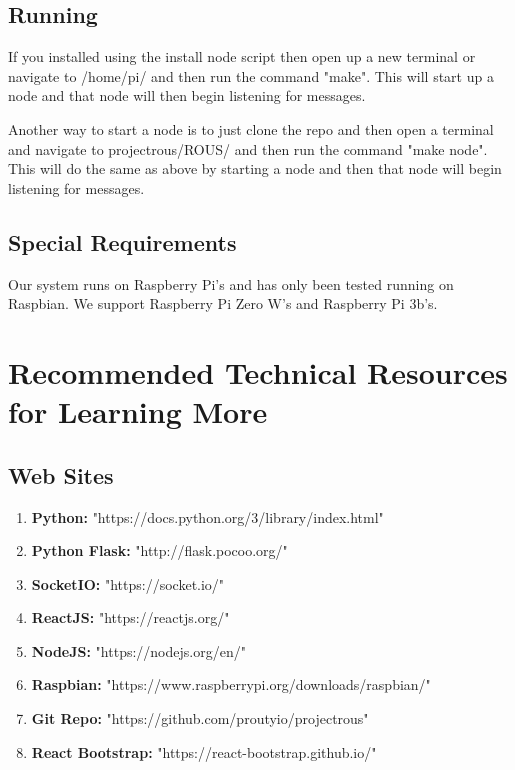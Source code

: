 \documentclass[draftclsnofoot, onecolumn, compsoc, 10pt]{IEEEtran}
\begin{document}
\subsection{Running}
If you installed using the install node script then open up a new terminal or navigate to /home/pi/ and then run the command "make". This will start up a node and that node will then begin listening for messages.

Another way to start a node is to just clone the repo and then open a terminal and navigate to projectrous/ROUS/ and then run the command "make node". This will do the same as above by starting a node and then that node will begin listening for messages.

\subsection{Special Requirements}
Our system runs on Raspberry Pi's and has only been tested running on Raspbian. We support Raspberry Pi Zero W's and Raspberry Pi 3b's. 

\section{Recommended Technical Resources for Learning More}
\subsection{Web Sites}
\begin{enumerate}
    \item \textbf{Python:} "https://docs.python.org/3/library/index.html"
    \item \textbf{Python Flask:} "http://flask.pocoo.org/"
    \item \textbf{SocketIO:} "https://socket.io/"
    \item \textbf{ReactJS:} "https://reactjs.org/"
    \item \textbf{NodeJS:} "https://nodejs.org/en/"
    \item \textbf{Raspbian:} "https://www.raspberrypi.org/downloads/raspbian/"
    \item \textbf{Git Repo:} "https://github.com/proutyio/projectrous"
    \item \textbf{React Bootstrap:} "https://react-bootstrap.github.io/"
    
\end{enumerate}
\end{document}
